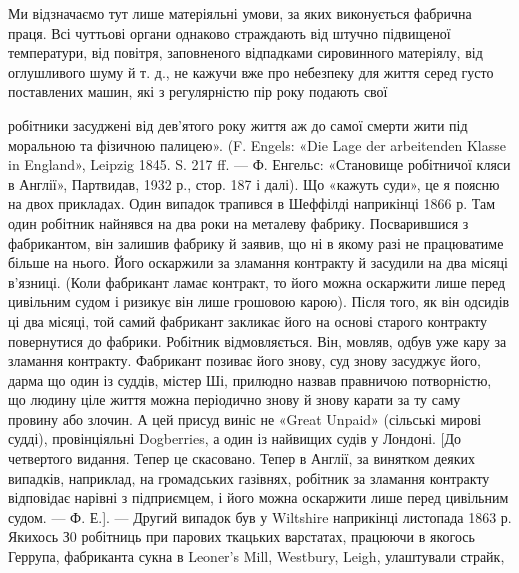Ми відзначаємо тут лише матеріяльні умови, за яких виконується
фабрична праця. Всі чуттьові органи однаково страждають
від штучно підвищеної температури, від повітря, заповненого
відпадками сировинного матеріялу, від оглушливого шуму
й т. д., не кажучи вже про небезпеку для життя серед густо
поставлених машин, які з регулярністю пір року подають свої

робітники засуджені від дев’ятого року життя аж до самої смерти жити
під моральною та фізичною палицею». (F. Engels: «Die Lage der
arbeitenden Klasse in England», Leipzig 1845. S. 217 ff. — Ф. Енгельс:
«Становище робітничої кляси в Англії», Партвидав, 1932 р., стор. 187 і
далі). Що «кажуть суди», це я поясню на двох прикладах. Один випадок
трапився в Шеффілді наприкінці 1866 р. Там один робітник найнявся
на два роки на металеву фабрику. Посварившися з фабрикантом,
він залишив фабрику й заявив, що ні в якому разі не працюватиме
більше на нього. Його оскаржили за зламання контракту й засудили
на два місяці в’язниці. (Коли фабрикант ламає контракт, то його можна
оскаржити лише перед цивільним судом і ризикує він лише грошовою
карою). Після того, як він одсидів ці два місяці, той самий фабрикант
закликає його на основі старого контракту повернутися до фабрики.
Робітник відмовляється. Він, мовляв, одбув уже кару за зламання контракту.
Фабрикант позиває його знову, суд знову засуджує його, дарма
що один із суддів, містер Ші, прилюдно назвав правничою потворністю,
що людину ціле життя можна періодично знову й знову карати за ту саму
провину або злочин. А цей присуд виніс не «Great Unpaid» (сільські
мирові судді), провінціяльні Dogberries, а один із найвищих судів у
Лондоні. [До четвертого видання. Тепер це скасовано. Тепер в Англії,
за винятком деяких випадків, наприклад, на громадських газівнях, робітник
за зламання контракту відповідає нарівні з підприємцем, і його
можна оскаржити лише перед цивільним судом. — Ф. Е.]. — Другий
випадок був у Wiltshire наприкінці листопада 1863 р. Якихось З0 робітниць
при парових ткацьких варстатах, працюючи в якогось Геррупа,
фабриканта сукна в Leoner’s Mill, Westbury, Leigh, улаштували страйк,

